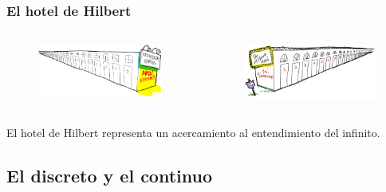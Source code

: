 \begin{frame}
 \frametitle{El hotel de Hilbert}
  
 \begin{columns}[c] %

\begin{figure}
\includegraphics[width=1.1\linewidth]{IMGS/hilbert-hotel-L}
\end{figure}

\begin{figure}
\includegraphics[width=1.1\linewidth]{IMGS/hilbert-hotel-R}
\end{figure}

\end{columns}

\vfill
\justifying
El hotel de Hilbert representa un acercamiento al entendimiento del infinito.
\end{frame}

\subsection{El discreto y el continuo}

